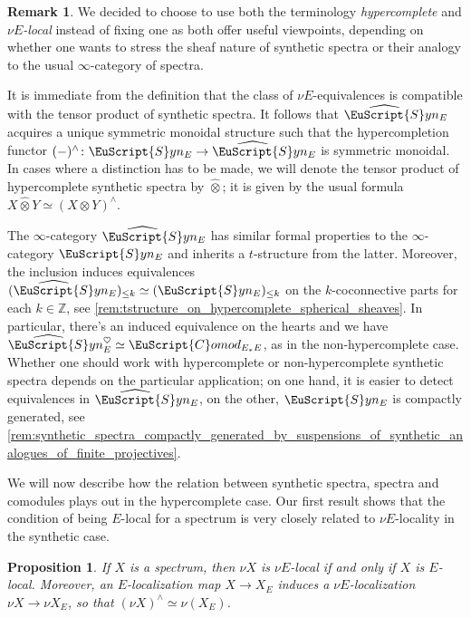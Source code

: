 \documentclass[oneside,a4paper]{amsart}
\newcommand{\euscr}[1]{\EuScript{#1}} %
\newcommand{\synspectra}{\euscr{S}yn} %
\newcommand{\hpsynspectra}{\widehat{\euscr{S}}yn} %
\newcommand{\Comod}{\euscr{C}omod} %
\newcommand{\ComodE}{\Comod_{E_{*}E}} %
\theoremstyle{plain}
\newtheorem{prop}[thm]{Proposition}
\theoremstyle{definition}
\newtheorem{rem}[thm]{Remark}
\theoremstyle{remark}
\begin{document}
\begin{rem}
We decided to choose to use both the terminology \emph{hypercomplete} and \emph{$\nu E$-local} instead of fixing one as both offer useful viewpoints, depending on whether one wants to stress the sheaf nature of synthetic spectra or their analogy to the usual $\infty$-category of spectra. 
\end{rem}

It is immediate from the definition that the class of $\nu E$-equivalences is compatible with the tensor product of synthetic spectra. It follows that $\hpsynspectra_{E}$ acquires a unique symmetric monoidal structure such that the hypercompletion functor $(-)^{\wedge} \colon \synspectra_{E} \rightarrow \hpsynspectra_{E}$ is symmetric monoidal. In cases where a distinction has to be made, we will denote the tensor product of hypercomplete synthetic spectra by $\widehat{\otimes}$; it is given by the usual formula $X \widehat{\otimes} Y \simeq (X \otimes Y)^{\wedge}$. 

The $\infty$-category $\hpsynspectra_{E}$ has similar formal properties to the $\infty$-category $\synspectra_{E}$ and inherits a $t$-structure from the latter. Moreover, the inclusion induces equivalences $(\hpsynspectra_{E})_{\leq k} \simeq (\synspectra_{E})_{\leq k}$ on the $k$-coconnective parts for each $k \in \mathbb{Z}$, see \cref{rem:tstructure_on_hypercomplete_spherical_sheaves}. In particular, there's an induced equivalence on the hearts and we have $\hpsynspectra_{E}^{\heartsuit} \simeq \ComodE$, as in the non-hypercomplete case. Whether one should work with hypercomplete or non-hypercomplete synthetic spectra depends on the particular application; on one hand, it is easier to detect equivalences in $\hpsynspectra_{E}$, on the other, $\synspectra_{E}$ is compactly generated, see \cref{rem:synthetic_spectra_compactly_generated_by_suspensions_of_synthetic_analogues_of_finite_projectives}. 

We will now describe how the relation between synthetic spectra, spectra and comodules plays out in the hypercomplete case. Our first result shows that the condition of being $E$-local for a spectrum is very closely related to $\nu E$-locality in the synthetic case. 

\begin{prop}
\label{prop:synthetic_analogue_of_e_local_spectrum_nue_local}
If $X$ is a spectrum, then $\nu X$ is $\nu E$-local if and only if $X$ is $E$-local. Moreover, an $E$-localization map $X \rightarrow X_{E}$ induces a $\nu E$-localization $\nu X \rightarrow \nu X_{E}$, so that $(\nu X)^{\wedge} \simeq \nu (X_{E})$. 
\end{prop}
\end{document}
